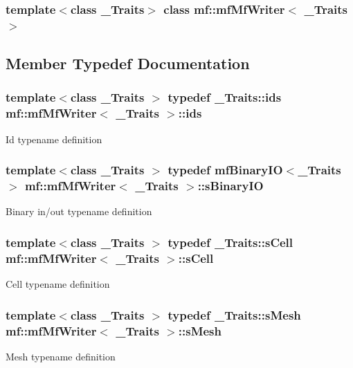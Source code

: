 \subsubsection*{template$<$class \_\-Traits$>$ class mf::mfMfWriter$<$ \_\-Traits $>$}



\subsection{Member Typedef Documentation}
\hypertarget{classmf_1_1mfMfWriter_a46296c1b8fe7d05f31495f65457ac945}{
\subsubsection[{ids}]{\setlength{\rightskip}{0pt plus 5cm}template$<$class \_\-Traits $>$ typedef \_\-Traits::ids {\bf mf::mfMfWriter}$<$ \_\-Traits $>$::{\bf ids}}}
\label{classmf_1_1mfMfWriter_a46296c1b8fe7d05f31495f65457ac945}
Id typename definition \hypertarget{classmf_1_1mfMfWriter_aeeeccedc6616f608f33cf42ca2e68dcc}{
\subsubsection[{sBinaryIO}]{\setlength{\rightskip}{0pt plus 5cm}template$<$class \_\-Traits $>$ typedef {\bf mfBinaryIO}$<$\_\-Traits$>$ {\bf mf::mfMfWriter}$<$ \_\-Traits $>$::{\bf sBinaryIO}}}
\label{classmf_1_1mfMfWriter_aeeeccedc6616f608f33cf42ca2e68dcc}
Binary in/out typename definition \hypertarget{classmf_1_1mfMfWriter_a58fa8a1a76014a24f6f52fc77dd9cbb0}{
\subsubsection[{sCell}]{\setlength{\rightskip}{0pt plus 5cm}template$<$class \_\-Traits $>$ typedef \_\-Traits::sCell {\bf mf::mfMfWriter}$<$ \_\-Traits $>$::{\bf sCell}}}
\label{classmf_1_1mfMfWriter_a58fa8a1a76014a24f6f52fc77dd9cbb0}
Cell typename definition \hypertarget{classmf_1_1mfMfWriter_a2d08e4dc5186064ec4ef99b2d7442f5c}{
\subsubsection[{sMesh}]{\setlength{\rightskip}{0pt plus 5cm}template$<$class \_\-Traits $>$ typedef \_\-Traits::sMesh {\bf mf::mfMfWriter}$<$ \_\-Traits $>$::{\bf sMesh}}}
\label{classmf_1_1mfMfWriter_a2d08e4dc5186064ec4ef99b2d7442f5c}
Mesh typename definition 

